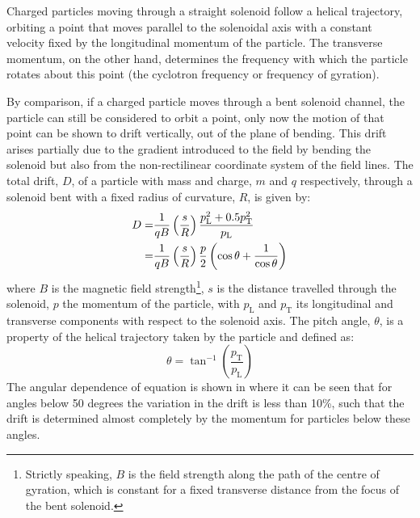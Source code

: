 Charged particles moving through a straight solenoid follow a helical
trajectory, orbiting a point that moves parallel to the solenoidal axis with a constant velocity fixed by the longitudinal momentum of the particle.
The transverse momentum, on the other hand, determines the frequency with which the particle rotates about this point (the cyclotron frequency or frequency of gyration).
\FigBentSolenoidRelativeDrift

By comparison, if a charged particle moves through a bent solenoid channel, the particle can still be considered to orbit a point, only now 
the motion of that point can be shown to drift vertically, out of the plane of bending.
This drift arises partially due to the gradient introduced to the field by bending the solenoid but also from the 
non-rectilinear coordinate system of the field lines.  
The total drift, $D$, of a particle with mass and charge, $m$ and $q$ respectively,  through a solenoid bent with a fixed radius of curvature, $R$, is given by:
\begin{align}
	D=&\frac{1}{qB}\left(\frac{s}{R}\right)\frac{p^2_\mathrm{L}+0.5p^2_\mathrm{T}}{p_\mathrm{L}}\eqlabel{detector:bent-solenoids:longVstrans}\\
	 =&\frac{1}{qB}\left(\frac{s}{R}\right)\frac{p}{2}\left(\cos\theta + \frac{1}{\cos\theta}\right)\eqlabel{detector:bent-solenoids:pitchAngle}
\end{align}
where $B$ is the magnetic field strength\footnote{Strictly speaking, $B$ is the field strength along the path of the centre of gyration, which is constant for a fixed transverse distance from the focus of the bent solenoid.},
$s$ is the distance travelled through the solenoid, $p$ the momentum of the particle, with $p_\mathrm{L}$ and $p_\mathrm{T}$ its longitudinal and transverse components with respect to the solenoid axis.
The pitch angle, $\theta$, is a property of the helical trajectory taken by the particle and defined as:
\begin{equation}
\theta=\tan^{-1}\left(\frac{p_\mathrm{T}}{p_\mathrm{L}}\right)
\end{equation}
The angular dependence of equation  is shown in
 where it can be seen that for
angles below 50 degrees the variation in the drift is less than 10\%, such that
the drift is determined almost completely by the momentum for particles below
these angles.

